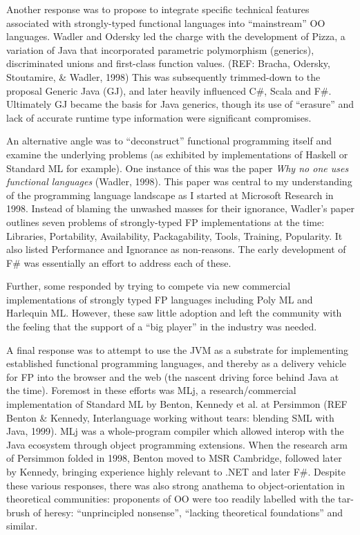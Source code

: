 \documentclass[acmsmall,review]{acmart}\settopmatter{printfolios=true,printccs=false,printacmref=false}
\begin{document}
Another response was to propose to integrate specific technical features associated with strongly-typed functional languages into “mainstream” OO languages.  Wadler and Odersky led the charge with the development of Pizza, a variation of Java that incorporated parametric polymorphism (generics), discriminated unions and first-class function values. (REF: Bracha, Odersky, Stoutamire, \& Wadler, 1998)  This was subsequently trimmed-down to the proposal Generic Java (GJ), and later heavily influenced C\#, Scala and F\#. Ultimately GJ became the basis for Java generics, though its use of “erasure” and lack of accurate runtime type information were significant compromises. 

An alternative angle was to “deconstruct” functional programming itself and examine the underlying problems (as exhibited by implementations of Haskell or Standard ML for example). One instance of this was the paper \textit{Why no one uses functional languages} (Wadler, 1998). This paper was central to my understanding of the programming language landscape as I started at Microsoft Research in 1998.  Instead of blaming the unwashed masses for their ignorance, Wadler’s paper outlines seven problems of strongly-typed FP implementations at the time: Libraries, Portability, Availability, Packagability, Tools, Training, Popularity.  It also listed Performance and Ignorance as non-reasons. The early development of F\# was essentially an effort to address each of these.

Further, some responded by trying to compete via new commercial implementations of strongly typed FP languages including Poly ML and Harlequin ML. However, these saw little adoption and left the community with the feeling that the support of a “big player” in the industry was needed. 

A final response was to attempt to use the JVM as a substrate for implementing established functional programming languages, and thereby as a delivery vehicle for FP into the browser and the web (the nascent driving force behind Java at the time).  Foremost in these efforts was MLj, a research/commercial implementation of Standard ML by Benton, Kennedy et al. at Persimmon (REF Benton \& Kennedy, Interlanguage working without tears: blending SML with Java, 1999).  MLj was a whole-program compiler which allowed interop with the Java ecosystem through object programming extensions. When the research arm of Persimmon folded in 1998, Benton moved to MSR Cambridge, followed later by Kennedy, bringing experience highly relevant to .NET and later F\#. Despite these various responses, there was also strong anathema to object-orientation in theoretical communities: proponents of OO were too readily labelled with the tar-brush of heresy: “unprincipled nonsense”, “lacking theoretical foundations” and similar.  
\end{document}
